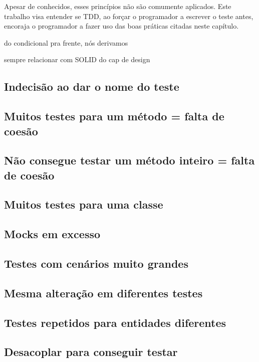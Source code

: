 Apesar de conhecidos, esses princípios não são comumente aplicados.
Este trabalho visa entender se TDD, ao forçar o programador a escrever o teste
antes, encoraja o programador a fazer uso das boas práticas citadas neste
capítulo.


do condicional pra frente, nós derivamos

sempre relacionar com SOLID do cap de design

\subsection{Indecisão ao dar o nome do teste}

\subsection{Muitos testes para um método = falta de coesão}

\subsection{Não consegue testar um método inteiro = falta de coesão}

\subsection{Muitos testes para uma classe}

\subsection{Mocks em excesso}

\subsection{Testes com cenários muito grandes}

\subsection{Mesma alteração em diferentes testes}

\subsection{Testes repetidos para entidades diferentes}

\subsection{Desacoplar para conseguir testar}

